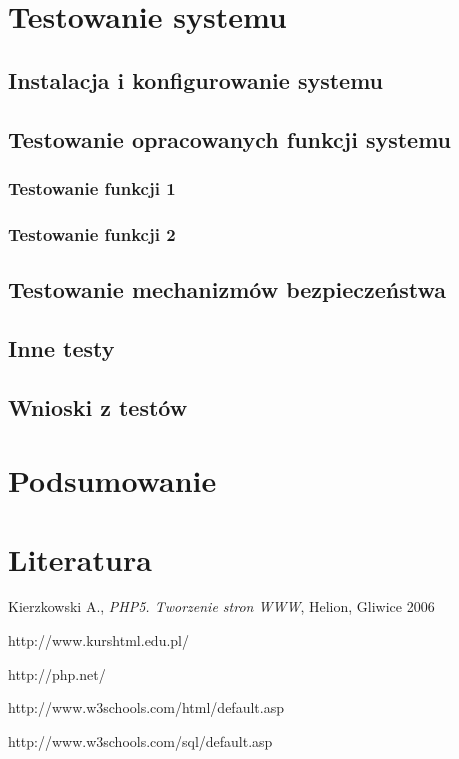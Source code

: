 \documentclass[a4paper, 12pt]{article}
\begin{document}
\section{Testowanie systemu}
\subsection{Instalacja i konfigurowanie systemu}
\subsection{Testowanie opracowanych funkcji systemu}
\subsubsection{Testowanie funkcji 1}
\subsubsection{Testowanie funkcji 2}
\subsection{Testowanie mechanizmów bezpieczeństwa}
\subsection{Inne testy}
\subsection{Wnioski z testów}
\section{Podsumowanie}

\section{Literatura}
\begin{enumerate}[label={[\arabic*]}]
	\item Kierzkowski A., \textit{PHP5. Tworzenie stron WWW}, Helion, Gliwice 2006
	\item http://www.kurshtml.edu.pl/
	\item http://php.net/
	\item http://www.w3schools.com/html/default.asp
	\item http://www.w3schools.com/sql/default.asp
\end{enumerate}
\end{document}
